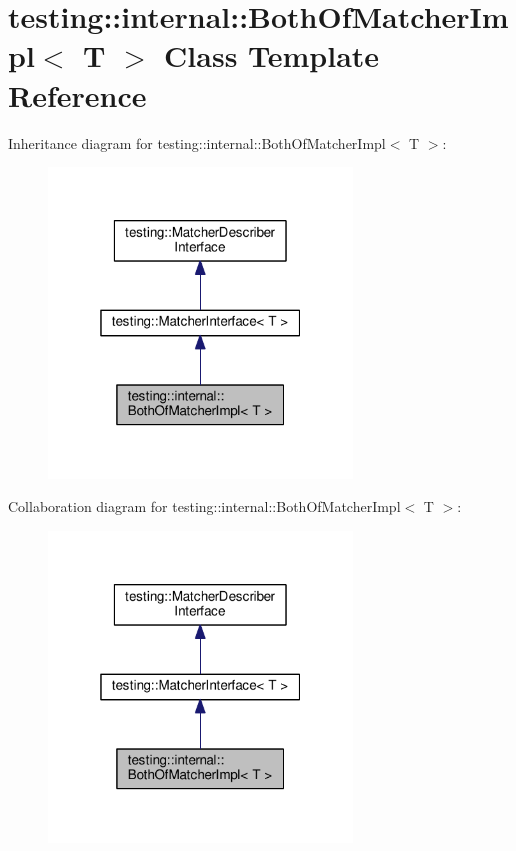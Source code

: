 \hypertarget{classtesting_1_1internal_1_1BothOfMatcherImpl}{}\section{testing\+:\+:internal\+:\+:Both\+Of\+Matcher\+Impl$<$ T $>$ Class Template Reference}
\label{classtesting_1_1internal_1_1BothOfMatcherImpl}


Inheritance diagram for testing\+:\+:internal\+:\+:Both\+Of\+Matcher\+Impl$<$ T $>$\+:\nopagebreak
\begin{figure}[H]
\begin{center}
\leavevmode
\includegraphics[width=229pt]{classtesting_1_1internal_1_1BothOfMatcherImpl__inherit__graph}
\end{center}
\end{figure}


Collaboration diagram for testing\+:\+:internal\+:\+:Both\+Of\+Matcher\+Impl$<$ T $>$\+:\nopagebreak
\begin{figure}[H]
\begin{center}
\leavevmode
\includegraphics[width=229pt]{classtesting_1_1internal_1_1BothOfMatcherImpl__coll__graph}
\end{center}
\end{figure}
